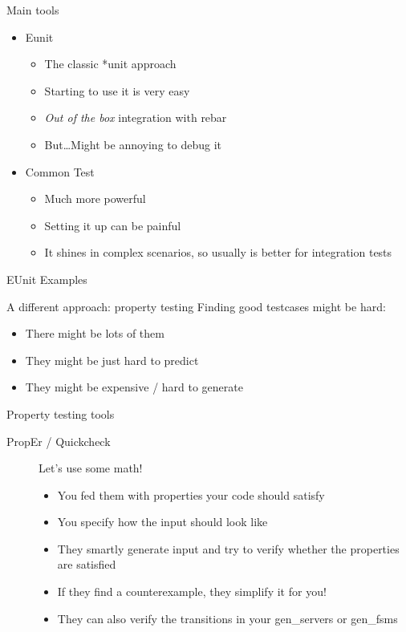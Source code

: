 \documentclass[pdf]{beamer}
\begin{document}
\begin{frame}{Main tools}
    \begin{itemize}
    \item Eunit
        \begin{itemize}
        \item The classic *unit approach
        \item Starting to use it is very easy
        \item \emph{Out of the box} integration with rebar
        \item But\dots Might be annoying to debug it
        \end{itemize}
    \item Common Test
        \begin{itemize}
        \item Much more powerful
        \item Setting it up can be painful
        \item It shines in complex scenarios, so usually is better for integration tests
        \end{itemize}
    \end{itemize}
\end{frame}

\begin{frame}{EUnit Examples}
\end{frame}

\begin{frame}{A different approach: property testing}
    Finding good testcases might be hard:
    \begin{itemize}
    \item There might be lots of them
    \pause
    \item They might be just hard to predict
    \pause
    \item They might be expensive / hard to generate
    \end{itemize}
\end{frame}

\begin{frame}{Property testing tools}
    \begin{description}
    \item [PropEr / Quickcheck] Let's use some math!
        \begin{itemize}
        \item You fed them with properties your code should satisfy
        \item You specify how the input should look like
        \item They smartly generate input and try to verify whether the properties are satisfied
        \item If they find a counterexample, they simplify it for you!
        \item They can also verify the transitions in your gen\_servers or gen\_fsms
        \end{itemize}
    \end{description}
\end{frame}
\end{document}
